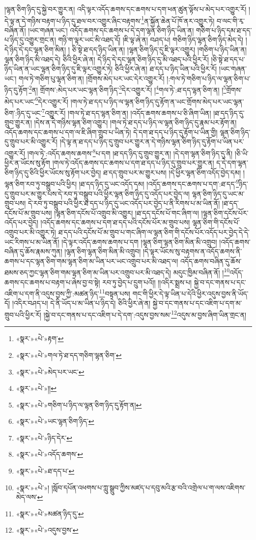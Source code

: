 །ལྷན་ཅིག་ཉིད་དུ་སྐྱེ་བར་གྱུར་ན། འདི་ལྟར་འདོད་ཆགས་དང་ཆགས་པ་དག་ཕན་ཚུན་ལྟོས་པ་མེད་པར་འགྱུར་རོ། །དེ་ལྟ་ན་དེ་གཉིས་བརྟག་པ་ཉིད་དུ་ཐལ་བར་འགྱུར་ཞིང་བརྟགས་\footnote{«སྣར་»«པེ་»རྟག་}ན་སྐྱོན་ཆེན་པོ་ཁོ་ནར་འགྱུར་ཏེ། བ་ལང་གི་རྭ་བཞིན་ནོ། །ཡང་གཞན་ཡང་། འདོད་ཆགས་དང་ཆགས་པ་དེ་དག་ལྷན་ཅིག་ཉིད་ཡིན་ན། གཅིག་པ་ཉིད་དམ་ཐ་དད་པ་ཉིད་དུ་འགྱུར་གྲང་ན། གཉི་ག་ལྟར་ཡང་མི་འཐད་དོ། །ཇི་ལྟ་ཞེ་ན། བཤད་པ། གཅིག་ཉིད་ལྷན་ཅིག་ཉིད་མེད་དེ། །དེ་ཉིད་དེ་དང་ལྷན་ཅིག་མིན། །
ཅི་སྟེ་ཐ་དད་ཉིད་ཡིན་ན། །ལྷན་ཅིག་ཉིད་དུ་ཇི་ལྟར་འགྱུར། །གཅིག་པ་ཉིད་ཡིན་ན། ལྷན་ཅིག་ཉིད་མི་འཐད་དེ། ཅིའི་ཕྱིར་ཞེ་ན། དེ་ཉིད་དེ་དང་ལྷན་ཅིག་ཉིད་དུ་མི་འཐད་པའི་ཕྱིར་རོ། །ཅི་སྟེ་ཐ་དད་པ་ཉིད་ཡིན་ན་ཡང་ལྷན་ཅིག་ཉིད་དུ་ཇི་ལྟར་འགྱུར་ཏེ། ཅིའི་ཕྱིར་ཞེ་ན། ཐ་དད་པ་ཉིད་ཡིན་པའི་ཕྱིར་རོ། །ཡང་གཞན་ཡང་། གལ་ཏེ་གཅིག་པུ་ལྷན་ཅིག་ན། །གྲོགས་མེད་པར་ཡང་དེར་འགྱུར་རོ། །:གལ་ཏེ་གཅིག་པ་ཉིད་ལ་ལྷན་ཅིག་པ་ཉིད་དུ་རྟོག་\footnote{«སྣར་»«པེ་»གལ་ཏེ་ཐ་དད་གཅིག་ལྷན་ཅིག་}ན། གྲོགས་:མེད་པར་ཡང་ལྷན་ཅིག་ཉིད་\footnote{«སྣར་»«པེ་»མེད་པར་ཡང་}དེར་འགྱུར་རོ། །\footnote{«སྣར་»«པེ་»།།}གལ་ཏེ་:ཐ་དད་ལྷན་ཅིག་ན། །\footnote{«སྣར་»«པེ་»གཅིག་པ་ཉིད་ལ་ལྷན་ཅིག་ཉིད་དུ་རྟོག་ན། }གྲོགས་མེད་པར་ཡང་\footnote{«སྣར་»«པེ་»ཡང་ལྷན་ཅིག་ཉིད་}དེར་འགྱུར་རོ། །གལ་ཏེ་ཐ་དད་པ་ཉིད་ལ་ལྷན་ཅིག་ཉིད་དུ་རྟོག་ན་ཡང་གྲོགས་མེད་པར་ཡང་ལྷན་ཅིག་:ཉིད་དུ་ཡང་\footnote{«སྣར་»«པེ་»ཉིད་དེར་}འགྱུར་རོ། །གལ་ཏེ་ཐ་དད་ལྷན་ཅིག་ན། །འདོད་ཆགས་ཆགས་པ་ཅི་ཞིག་ཡིན། །ཐ་དད་ཉིད་དུ་གྲུབ་གྱུར་ན། །དེས་ན་དེ་གཉིས་ལྷན་ཅིག་འགྱུར། །གལ་ཏེ་ཐ་དད་པ་ཉིད་ལ་ལྷན་ཅིག་ཉིད་དུ་རྣམ་པར་རྟོག་ན། འདོད་ཆགས་དང་ཆགས་པ་དག་ལ་ཇི་ཞིག་གྲུབ་པ་ཡིན་ཏེ། དེ་དག་ཐ་དད་པ་ཉིད་དུ་རྟོག་པ་ཡིན་གྱི། ལྷན་ཅིག་ཉིད་དུ་གྲུབ་པར་མི་འགྱུར་རོ། །དེ་ལྟ་ན་ཐ་དད་པ་ཉིད་དུ་གྲུབ་པར་གྱུར་ན་དེ་གཉིས་ལྷན་ཅིག་ཉིད་དུ་རྟོག་པ་ཡིན་པར་འགྱུར་རོ། །གལ་ཏེ་:འདོད་ཆགས་ཆགས་\footnote{«སྣར་»«པེ་»འདོད་ཆགས་}པ་དག །ཐ་དད་ཉིད་དུ་གྲུབ་གྱུར་ན། །དེ་དག་ལྷན་ཅིག་ཉིད་དུ་ནི། །ཅི་ཡི་ཕྱིར་ན་ཡོངས་སུ་རྟོག །གལ་ཏེ་འདོད་ཆགས་དང་ཆགས་པ་དག་ཐ་དད་པ་ཉིད་དུ་གྲུབ་པར་གྱུར་ན། ད་དེ་དག་ལྷན་ཅིག་ཉིད་དུ་ཅིའི་ཕྱིར་ཡོངས་སུ་རྟོག་པར་བྱེད། ཐ་དད་གྲུབ་པར་མ་གྱུར་པས། །དེ་ཕྱིར་ལྷན་ཅིག་འདོད་བྱེད་དམ། །ལྷན་ཅིག་རབ་ཏུ་བསྒྲུབ་པའི་ཕྱིར། །ཐ་དད་ཉིད་དུ་ཡང་འདོད་དམ། །འདོད་ཆགས་དང་ཆགས་པ་དག་:ཐ་དད་\footnote{«སྣར་»«པེ་»ཐ་དད་པ་}ཉིད་དུ་གྲུབ་པར་མ་གྱུར་པས་དེ་རབ་ཏུ་བསྒྲུབ་པའི་ཕྱིར་ལྷན་ཅིག་ཉིད་དུ་འདོད་པར་བྱེད་ལ། ལྷན་ཅིག་ཉིད་དུ་ཡང་མ་གྲུབ་པས། དེ་རབ་ཏུ་བསྒྲུབ་པའི་ཕྱིར་ཐ་དད་པ་ཉིད་དུ་ཡང་འདོད་པར་བྱེད་པ་ནི་རིགས་པ་མ་ཡིན་ནོ། །ཐ་དད་དངོས་པོ་མ་གྲུབ་པས། །ལྷན་ཅིག་དངོས་པོ་འགྲུབ་མི་འགྱུར། །ཐ་དད་དངོས་པོ་གང་ཞིག་ལ། །ལྷན་ཅིག་དངོས་པོར་འདོད་པར་བྱེད། །འདོད་ཆགས་དང་ཆགས་པ་དག་ཐ་དད་པའི་དངོས་པོར་མ་གྲུབ་པས། ལྷན་ཅིག་གི་དངོས་པོ་འགྲུབ་པར་མི་འགྱུར་ཏེ། ཐ་དད་པའི་དངོས་པོ་མ་གྲུབ་པ་གང་ཞིག་ལ་ལྷན་ཅིག་གི་དངོས་པོར་འདོད་པར་བྱེད་དེ་དེ་ཡང་རིགས་པ་མ་ཡིན་ནོ། །དེ་ལྟར་འདོད་ཆགས་ཆགས་པ་དག །ལྷན་ཅིག་ལྷན་ཅིག་མིན་མི་འགྲུབ། །འདོད་ཆགས་བཞིན་དུ་ཆོས་རྣམས་ཀུན། །ལྷན་ཅིག་ལྷན་ཅིག་མིན་མི་འགྲུབ། །དེ་ལྟར་ཡོངས་སུ་བརྟགས་ན་འདོད་ཆགས་ནི་ཆགས་པ་དང་ལྷན་ཅིག་གམ་ལྷན་ཅིག་མ་ཡིན་པར་ཡང་འགྲུབ་པར་མི་འཐད་ལ། འདོད་ཆགས་བཞིན་དུ་ཆོས་ཐམས་ཅད་ཀྱང་ལྷན་ཅིག་གམ་ལྷན་ཅིག་མ་ཡིན་པར་འགྲུབ་པར་མི་འཐད་དེ། མདུང་ཁྱིམ་བཞིན་ནོ། །\footnote{«སྣར་»«པེ་»། །སློབ་དཔོན་འཕགས་པ་ཀླུ་སྒྲུབ་ཀྱིས་མཛད་པ་དབུ་མའི་རྩ་བའི་འགྲེལ་པ་ག་ལས་འཇིགས་མེད་ལས་}འདོད་ཆགས་དང་ཆགས་པ་བརྟག་པ་ཞེས་བྱ་བ་སྟེ། རབ་ཏུ་བྱེད་པ་དྲུག་པའོ།། །།འདིར་སྨྲས་པ། སྐྱེ་བ་དང་གནས་པ་དང་འཇིག་པ་དག་ནི་འདུས་བྱས་ཀྱི་:མཚན་ཉིད་\footnote{«སྣར་»«པེ་»མཚན་ཉིད་དུ་}བསྟན་པས། གང་གི་ཕྱིར་དེ་ལྟ་ཡིན་པ་དེའི་ཕྱིར་འདུས་བྱས་ནི་ཡོད་དོ། །འདིར་བཤད་པ། དེ་ནི་ཡོད་པ་མ་ཡིན་པ་ཉིད་དེ། ཅིའི་ཕྱིར་ཞེ་ན། སྐྱེ་བ་དང་གནས་པ་དང་འཇིག་པ་དག་མ་གྲུབ་པའི་ཕྱིར་རོ། །སྐྱེ་བ་དང་གནས་པ་དང་འཇིག་པ་དེ་དག་:འདུས་བྱས་སམ་\footnote{«སྣར་»«པེ་»འདུས་བྱས་}འདུས་མ་བྱས་ཞིག་ཡིན་གྲང་ན། 